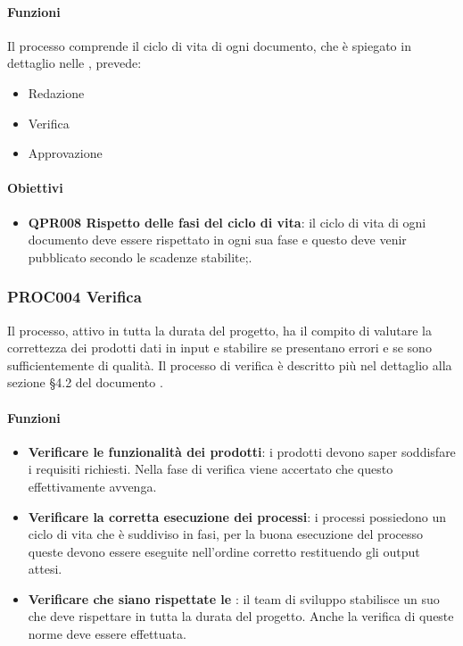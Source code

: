 		\paragraph*{Funzioni}
		Il processo comprende il ciclo di vita di ogni documento, che è spiegato in dettaglio nelle \Doc{\NdPv}, prevede:
		
		\begin{itemize}
			\item Redazione
			\item Verifica
			\item Approvazione
		\end{itemize}
	
		\paragraph*{Obiettivi}
		
		\begin{itemize}
			\item \textbf{QPR008 Rispetto delle fasi del ciclo di vita}: il ciclo di vita di ogni documento deve essere rispettato in ogni sua fase e questo deve venir pubblicato secondo le scadenze stabilite;.
		\end{itemize}

	\subsubsection{PROC004 Verifica}
	Il processo, attivo in tutta la durata del progetto, ha il compito di valutare la correttezza dei prodotti dati in input e stabilire se presentano errori
	e se sono sufficientemente di qualità. Il processo di verifica è descritto più nel dettaglio alla sezione §4.2 del documento \mbox{\Doc{\NdPv}}.
	
		\paragraph*{Funzioni}
		
		\begin{itemize}
			\item \textbf{Verificare le funzionalità dei prodotti}: i prodotti devono saper soddisfare i requisiti richiesti. Nella fase di verifica viene accertato che questo effettivamente avvenga.
			\item \textbf{Verificare la corretta esecuzione dei processi}: i processi possiedono un ciclo di vita che è suddiviso in fasi, per la buona esecuzione del processo queste devono essere eseguite nell'ordine corretto restituendo gli output attesi.
			\item \textbf{Verificare che siano rispettate le \NdP}: il team di sviluppo stabilisce un suo  che deve rispettare in tutta la durata del progetto. Anche la verifica di queste norme deve essere effettuata.
		\end{itemize}
		
